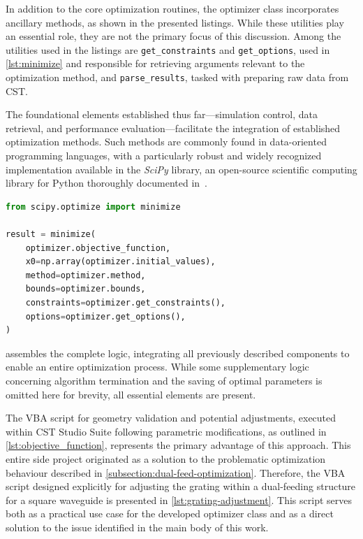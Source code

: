 \documentclass[11pt,a4paper,twoside,openany]{report}
\begin{document}
In addition to the core optimization routines, the optimizer class incorporates ancillary methods, as shown in the presented listings. While these utilities play an essential role, they are not the primary focus of this discussion.  Among the utilities used in the listings are \texttt{get\_constraints} and \texttt{get\_options}, used in \cref{lst:minimize} and responsible for retrieving arguments relevant to the optimization method, and \texttt{parse\_results}, tasked with preparing raw data from CST.

The foundational elements established thus far---simulation control, data retrieval, and performance evaluation---facilitate the integration of established optimization methods. Such methods are commonly found in data-oriented programming languages, with a particularly robust and widely recognized implementation available in the \emph{SciPy} library, an open-source scientific computing library for Python thoroughly documented in~\parencite{virtanen-et-al:scipy}.

\begin{lstlisting}[caption={Use of CSTOptimizer with SciPy}, label={lst:minimize}, language=Python]
from scipy.optimize import minimize

result = minimize(
    optimizer.objective_function,
    x0=np.array(optimizer.initial_values),
    method=optimizer.method,
    bounds=optimizer.bounds,
    constraints=optimizer.get_constraints(),
    options=optimizer.get_options(),
)
\end{lstlisting}

 assembles the complete logic, integrating all previously described components to enable an entire optimization process. While some supplementary logic concerning algorithm termination and the saving of optimal parameters is omitted here for brevity, all essential elements are present.

The VBA script for geometry validation and potential adjustments, executed within CST Studio Suite following parametric modifications, as outlined in \cref{lst:objective_function}, represents the primary advantage of this approach. This entire side project originated as a solution to the problematic optimization behaviour described in \cref{subsection:dual-feed-optimization}. Therefore, the VBA script designed explicitly for adjusting the grating within a dual-feeding structure for a square waveguide is presented in \cref{lst:grating-adjustment}. This script serves both as a practical use case for the developed optimizer class and as a direct solution to the issue identified in the main body of this work.
\end{document}
